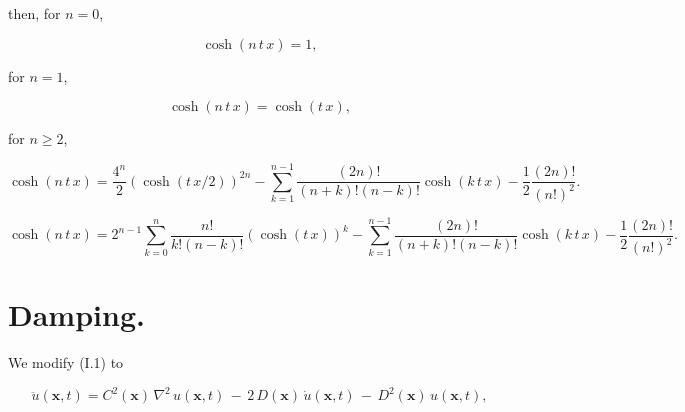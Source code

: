 \documentclass[amsmath,amssymb,floatfix]{revtex4}
\numberwithin{equation}{section}
\begin{document}
\noindent
then, for $n = 0$,

\begin{equation}
\cosh{(n \, t \, x)} = 1,
\end{equation}

\noindent
for $n = 1$,

\begin{equation}
\cosh{(n \, t \, x)} = \cosh{( t \, x)},
\end{equation}

\noindent
for $n \ge 2$,

\begin{equation}
\cosh{(n \, t \, x)} = \frac{4^n}{2} (\cosh{(t \, x/2)})^{2n} - \sum_{k=1}^{n-1} \frac{(2n)!}{(n+k)!(n-k)!} \cosh{(k \, t \, x)} - \frac{1}{2} \frac{(2n)!}{(n!)^2}.
\end{equation}


\begin{equation}
\cosh{(n \, t \, x)} = 2^{n-1}  \sum_{k=0}^{n} \frac{n!}{k!(n-k)!} (\cosh{(t \, x)})^{k} - \sum_{k=1}^{n-1} \frac{(2n)!}{(n+k)!(n-k)!} \cosh{(k \, t \, x)} - \frac{1}{2} \frac{(2n)!}{(n!)^2}.
\end{equation}









\section{\label{sec:level3}Damping.\protect}

We modify (I.1) to

\begin{equation}
	\ddot{u}(\mathbf{x},t)  = C^2(\mathbf{x})\, \nabla^2 \, u(\mathbf{x},t) \, - \, 2\,D(\mathbf{x}) \, \dot{u}(\mathbf{x},t) \, - \,D^2(\mathbf{x}) \,u(\mathbf{x},t) ,
\end{equation}
\end{document}
